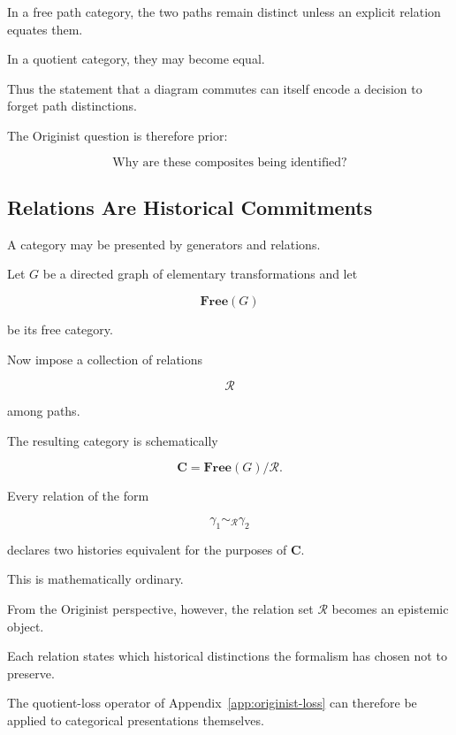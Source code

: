 \documentclass[
  11pt,
  a4paper,
  DIV=12,
  BCOR=0mm,
  parskip=half-
]{scrartcl}
\theoremstyle{definition}
\theoremstyle{plain}
\theoremstyle{remark}
\begin{document}
In a free path category, the two paths remain distinct unless an explicit
relation equates them.

In a quotient category, they may become equal.

Thus the statement that a diagram commutes can itself encode a decision to
forget path distinctions.

The Originist question is therefore prior:

\[
  \text{Why are these composites being identified?}
\]


\subsection{Relations Are Historical Commitments}
\label{app:relations-as-commitments}

A category may be presented by generators and relations.

Let \(G\) be a directed graph of elementary transformations and let

\[
  \mathbf{Free}(G)
\]

be its free category.

Now impose a collection of relations

\[
  \mathcal R
\]

among paths.

The resulting category is schematically

\[
  \mathbf C
  =
  \mathbf{Free}(G)/{\mathcal R}.
\]

Every relation of the form

\[
  \gamma_1\sim_{\mathcal R}\gamma_2
\]

declares two histories equivalent for the purposes of \(\mathbf C\).

This is mathematically ordinary.

From the Originist perspective, however, the relation set \(\mathcal R\)
becomes an epistemic object.

Each relation states which historical distinctions the formalism has chosen
not to preserve.

The quotient-loss operator of Appendix~\ref{app:originist-loss} can therefore
be applied to categorical presentations themselves.

\end{document}
